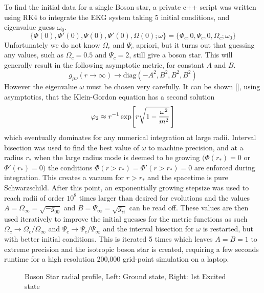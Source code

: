 To find the initial data for a single Boson star, a private c++ script was written using RK4 to integrate the EKG system taking 5 initial conditions, and eigenvalue guess $\omega_0$. 
\begin{equation} \{\Phi(0),\Phi'(0),\Psi(0),\Psi'(0),\Omega(0);\omega \} = \{ \Phi_c,0,\Psi_c,0,\Omega_c;\omega_0\}\end{equation}
Unfortunately we do not know $\Omega_c$ and $\Psi_c$ apriori, but it turns out that guessing any values, such as $\Omega_c=0.5$ and $\Psi_c=2$, still give a boson star. This will generally result in the following asymptotic metric, for constant $A$ and $B$.
\begin{equation} g_{\mu\nu}(r\rightarrow\infty) \rightarrow \mathrm{diag}(-A^2,B^2,B^2,B^2)\end{equation}
However the eigenvalue $\omega$ must be chosen very carefully. It can be shown [], using asymptotics, that the Klein-Gordon equation has a second solution 
\begin{equation}\varphi_2 \approx r^{-1}\exp[r\sqrt{1-\frac{\omega^2}{m^2}}\,]\end{equation}
 which eventually dominates for any numerical integration at large radii. Interval bisection was used to find the best value of $\omega$ to machine precision, and at a radius $r_*$ when the large radius mode is deemed to be growing $(\Phi(r_*)=0$ or $\Phi'(r_*)=0)$ the conditions $\Phi(r>r_*)=\Phi'(r>r_*)=0$ are enforced during integration. This creates a vacuum for $r>r_*$ and the spacetime is pure Schwarzschild. After this point, an exponentially growing stepsize was used to reach radii of order $10^8$ times larger than desired for evolutions and the values $A = \Omega_\infty= \sqrt{-g_{00}}$ and $B=\Psi_{\infty}=\sqrt{g_{ii}}$ can be read off. These values are then used iteratively to improve the initial guesses for the metric functions as such $\Omega_c \rightarrow \Omega_c / \Omega_\infty$ and $\Psi_c \rightarrow \Psi_c / \Psi_\infty$ and the interval bisection for $\omega$ is restarted, but with better initial conditions. This is iterated 5 times which leaves $A=B=1$ to extreme precision and the isotropic boson star is created, requiring a few seconds runtime for a high resolution 200,000 grid-point simulation on a laptop.



  \begin{figure}[H]
  \caption{Boson Star radial profile, Left: Ground state, Right: 1st Excited state}
  \centering
  \hfill
\end{figure}

